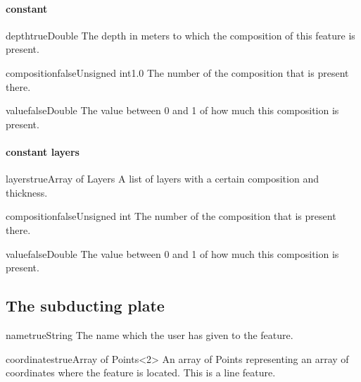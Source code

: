 \documentclass{book}
\begin{document}
\paragraph{constant}
\begin{parameterbox}{depth}{true}{Double}{}
The depth in meters to which the composition of this feature is present.
\end{parameterbox}

\begin{parameterbox}{composition}{false}{Unsigned int}{1.0}
The number of the composition that is present there.
\end{parameterbox}

\begin{parameterbox}{value}{false}{Double}{}
The value between 0 and 1 of how much this composition is present.
\end{parameterbox}

\paragraph{constant layers}
\begin{parameterbox}{layers}{true}{Array of Layers}{}
A list of layers with a certain composition and thickness.
\end{parameterbox}

\begin{parameterbox}{composition}{false}{Unsigned int}{}
The number of the composition that is present there.
\end{parameterbox}

\begin{parameterbox}{value}{false}{Double}{}
The value between 0 and 1 of how much this composition is present.
\end{parameterbox}


\subsection{The subducting plate}
\begin{parameterbox}{name}{true}{String}{}
The name which the user has given to the feature.
\end{parameterbox}

\begin{parameterbox}{coordinates}{true}{Array of Points<2>}{}
An array of Points representing an array of coordinates where the feature is located. This is a line feature.
\end{parameterbox}
\end{document}
